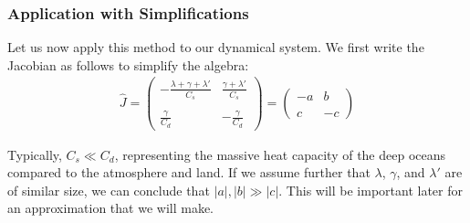 \subsubsection{Application with Simplifications}

Let us now apply this method to our dynamical system. We first write the Jacobian as follows to simplify the algebra:
\begin{align*}
    \hat{J}=\left( \begin{array}{cc}
        -\frac{\lambda+\gamma+\lambda'}{C_s} & \frac{\gamma+\lambda'}{C_s} \\\\
        \frac{\gamma}{C_d} & -\frac{\gamma}{C_d}
    \end{array}
    \right)
    =\left( \begin{array}{cc}
        -a & b \\\\
        c & -c
    \end{array}
    \right)
\end{align*}

Typically, $C_s\ll C_d$, representing the massive heat capacity of the deep oceans compared to the atmosphere and land. If we assume further that $\lambda$, $\gamma$, and $\lambda'$ are of similar size, we can conclude that $|a|,|b|\gg |c|$. This will be important later for an approximation that we will make. 

